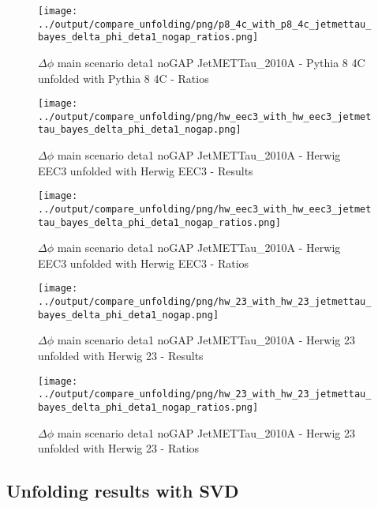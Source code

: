 \documentclass[11pt]{book}
\begin{document}
\begin{figure}[ht]
\centering
\texttt{[image: ../output/compare\_unfolding/png/p8\_4c\_with\_p8\_4c\_jetmettau\_bayes\_delta\_phi\_deta1\_nogap\_ratios.png]}
\caption{$\Delta\phi$ main scenario deta1 noGAP JetMETTau\_2010A - Pythia 8 4C unfolded with Pythia 8 4C - Ratios}
\label{p8_p8_jetmettau_bayes_delta_phi_deta1_nogap_b}
\end{figure}

\begin{figure}[ht]
\centering
\texttt{[image: ../output/compare\_unfolding/png/hw\_eec3\_with\_hw\_eec3\_jetmettau\_bayes\_delta\_phi\_deta1\_nogap.png]}
\caption{$\Delta\phi$ main scenario deta1 noGAP JetMETTau\_2010A - Herwig EEC3 unfolded with Herwig EEC3 - Results}
\label{hw_eec3_hw_eec3_jetmettau_bayes_delta_phi_deta1_nogap_a}
\end{figure}

\begin{figure}[ht]
\centering
\texttt{[image: ../output/compare\_unfolding/png/hw\_eec3\_with\_hw\_eec3\_jetmettau\_bayes\_delta\_phi\_deta1\_nogap\_ratios.png]}
\caption{$\Delta\phi$ main scenario deta1 noGAP JetMETTau\_2010A - Herwig EEC3 unfolded with Herwig EEC3 - Ratios}
\label{hw_eec3_hw_eec3_jetmettau_bayes_delta_phi_deta1_nogap_b}
\end{figure}

\begin{figure}[ht]
\centering
\texttt{[image: ../output/compare\_unfolding/png/hw\_23\_with\_hw\_23\_jetmettau\_bayes\_delta\_phi\_deta1\_nogap.png]}
\caption{$\Delta\phi$ main scenario deta1 noGAP JetMETTau\_2010A - Herwig 23 unfolded with Herwig 23 - Results}
\label{hw_23_hw_23_jetmettau_bayes_delta_phi_deta1_nogap_a}
\end{figure}

\begin{figure}[ht]
\centering
\texttt{[image: ../output/compare\_unfolding/png/hw\_23\_with\_hw\_23\_jetmettau\_bayes\_delta\_phi\_deta1\_nogap\_ratios.png]}
\caption{$\Delta\phi$ main scenario deta1 noGAP JetMETTau\_2010A - Herwig 23 unfolded with Herwig 23 - Ratios}
\label{hw_23_hw_23_jetmettau_bayes_delta_phi_deta1_nogap_b}
\end{figure}

\clearpage
\subsection{Unfolding results with SVD}
\end{document}
